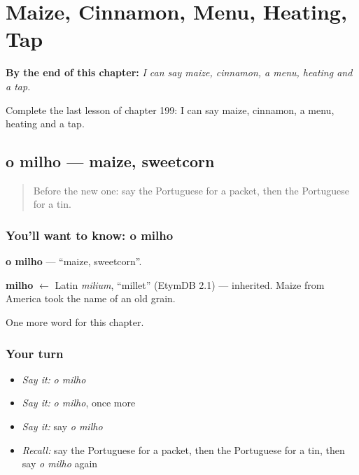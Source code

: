 
\chapter{Maize, Cinnamon, Menu, Heating, Tap}
\label{ch:pt-maize-cinnamon-menu-heating-tap}

\begin{chapteropening}
\textbf{By the end of this chapter:} \emph{I can say maize, cinnamon, a menu, heating and a tap.}

Complete the last lesson of chapter 199: I can say maize, cinnamon, a menu, heating and a tap.
\end{chapteropening}

\section[o milho]{o milho — maize, sweetcorn}

\label{lesson:PT-C199-milho}



\begin{quote}
Before the new one: say the Portuguese for a packet, then the Portuguese for a tin.
\end{quote}

\subsection*{You'll want to know: o milho}
\textbf{o milho} — \textquotedblleft{}maize, sweetcorn\textquotedblright{}.

\begin{cousinweb}
\textbf{milho} $\leftarrow$ Latin \emph{milium}, \textquotedblleft{}millet\textquotedblright{} (EtymDB 2.1) — inherited. Maize from America took the name of an old grain.
\end{cousinweb}

\begin{grammarlens}[title={What you've built}]
One more word for this chapter.
\end{grammarlens}

\subsection*{Your turn}
\begin{itemize}
\raggedright
  \item \emph{Say it:} \emph{o milho}
  \item \emph{Say it:} \emph{o milho}, once more
  \item \emph{Say it:} say \emph{o milho}
  \item \emph{Recall:} say the Portuguese for a packet, then the Portuguese for a tin, then say \emph{o milho} again
\end{itemize}

